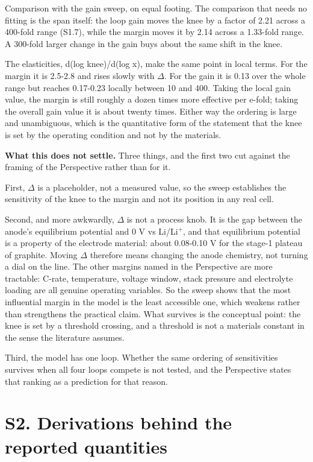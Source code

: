 \documentclass[11pt,a4paper]{article}
\begin{document}
Comparison with the gain sweep, on equal footing. The comparison that needs no fitting is the span itself: the loop gain moves the knee by a factor of 2.21 across a 400-fold range (S1.7), while the margin moves it by 2.14 across a 1.33-fold range. A 300-fold larger change in the gain buys about the same shift in the knee.


The elasticities, d(log knee)/d(log x), make the same point in local terms. For the margin it is 2.5-2.8 and rises slowly with \ensuremath{\Delta}. For the gain it is 0.13 over the whole range but reaches 0.17-0.23 locally between 10 and 400. Taking the local gain value, the margin is still roughly a dozen times more effective per e-fold; taking the overall gain value it is about twenty times. Either way the ordering is large and unambiguous, which is the quantitative form of the statement that the knee is set by the operating condition and not by the materials.


\textbf{What this does not settle.} Three things, and the first two cut against the framing of the Perspective rather than for it.


First, \ensuremath{\Delta} is a placeholder, not a measured value, so the sweep establishes the sensitivity of the knee to the margin and not its position in any real cell.


Second, and more awkwardly, \ensuremath{\Delta} is not a process knob. It is the gap between the anode's equilibrium potential and 0 V vs Li/Li\ensuremath{^{+}}, and that equilibrium potential is a property of the electrode material: about 0.08-0.10 V for the stage-1 plateau of graphite. Moving \ensuremath{\Delta} therefore means changing the anode chemistry, not turning a dial on the line. The other margins named in the Perspective are more tractable: C-rate, temperature, voltage window, stack pressure and electrolyte loading are all genuine operating variables. So the sweep shows that the most influential margin in the model is the least accessible one, which weakens rather than strengthens the practical claim. What survives is the conceptual point: the knee is set by a threshold crossing, and a threshold is not a materials constant in the sense the literature assumes.


Third, the model has one loop. Whether the same ordering of sensitivities survives when all four loops compete is not tested, and the Perspective states that ranking as a prediction for that reason.


\section*{S2. Derivations behind the reported quantities}
\end{document}
